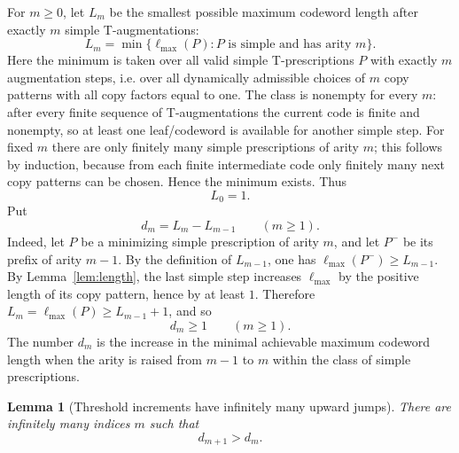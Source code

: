 \documentclass[11pt]{article}
\newtheorem{lemma}{Lemma}
\newcommand{\ellmax}{\ell_{\max}}
\begin{document}
For $m\geq 0$, let $L_m$ be the smallest possible maximum codeword length after exactly $m$ simple T-augmentations:
\begin{equation}
L_m=\min\{\ellmax(P): P\text{ is simple and has arity }m\}.
\end{equation}
Here the minimum is taken over all valid simple T-prescriptions $P$ with exactly $m$ augmentation steps, i.e. over all dynamically admissible choices of $m$ copy patterns with all copy factors equal to one.
The class is nonempty for every $m$: after every finite sequence of T-augmentations the current code is finite and nonempty, so at least one leaf/codeword is available for another simple step. For fixed $m$ there are only finitely many simple prescriptions of arity $m$; this follows by induction, because from each finite intermediate code only finitely many next copy patterns can be chosen. Hence the minimum exists. Thus
\begin{equation}
L_0=1.
\end{equation}
Put
\begin{equation}
d_m=L_m-L_{m-1}\qquad (m\geq 1).
\end{equation}
Indeed, let $P$ be a minimizing simple prescription of arity $m$, and let $P^-$ be its prefix of arity $m-1$. By the definition of $L_{m-1}$, one has $\ellmax(P^-)\geq L_{m-1}$. By Lemma~\ref{lem:length}, the last simple step increases $\ellmax$ by the positive length of its copy pattern, hence by at least $1$. Therefore $L_m=\ellmax(P)\geq L_{m-1}+1$, and so
\begin{equation}
d_m\geq 1\qquad (m\geq 1).
\end{equation}
The number $d_m$ is the increase in the minimal achievable maximum codeword length when the arity is raised from $m-1$ to $m$ within the class of simple prescriptions.

\begin{lemma}[Threshold increments have infinitely many upward jumps]
\label{lem:jumps}
There are infinitely many indices $m$ such that
\begin{equation}
d_{m+1}>d_m.
\end{equation}
\end{lemma}
\end{document}
